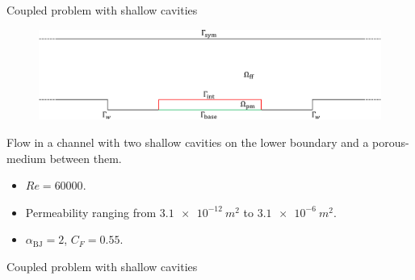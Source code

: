 \documentclass{beamer}
\begin{document}
\begin{frame}{Coupled problem with shallow cavities}
\begin{figure}
	\centering
	\includegraphics[width=\textwidth]{cavities_multidomain.pdf}
\end{figure}
Flow in a channel with two shallow cavities on the lower boundary and a porous-medium 
between them.
\begin{itemize}
	\item $Re=60000$.
	\item Permeability ranging from $\SI{3.1e-12}{m^2}$ to $\SI{3.1e-6}{m^2}$.
	\item $\alpha_\text{BJ} = 2$, $C_F=0.55$.
\end{itemize}
\end{frame}
\begin{frame}{Coupled problem with shallow cavities}
\begin{figure}
	\centering
	\hspace{-0.5cm}
	
\end{figure}
\end{frame}
\end{document}
